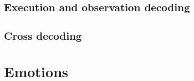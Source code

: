 \documentclass[a4,12pt]{ozu-thesis}
\begin{document}
\subsection{Execution and observation decoding}


\subsection{Cross decoding}


\section{Emotions}



\begin{thebibliography}{99}



\end{thebibliography}


\appendix



\begin{postliminary}
\end{postliminary}
\end{document}
